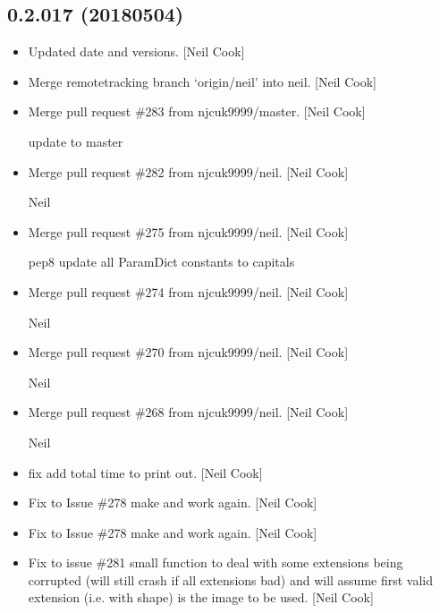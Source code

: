 \documentclass[a4paper,10pt,english]{report}
\begin{document}
\subsection{0.2.017 (2018\sphinxhyphen{}05\sphinxhyphen{}04)}
\label{\detokenize{misc/changelog:id462}}\begin{itemize}
\item {} 
Updated date and versions. {[}Neil Cook{]}

\item {} 
Merge remote\sphinxhyphen{}tracking branch ‘origin/neil’ into neil. {[}Neil Cook{]}

\item {} 
Merge pull request \#283 from njcuk9999/master. {[}Neil Cook{]}

update to master

\item {} 
Merge pull request \#282 from njcuk9999/neil. {[}Neil Cook{]}

Neil

\item {} 
Merge pull request \#275 from njcuk9999/neil. {[}Neil Cook{]}

pep8 update all ParamDict constants to capitals

\item {} 
Merge pull request \#274 from njcuk9999/neil. {[}Neil Cook{]}

Neil

\item {} 
Merge pull request \#270 from njcuk9999/neil. {[}Neil Cook{]}

Neil

\item {} 
Merge pull request \#268 from njcuk9999/neil. {[}Neil Cook{]}

Neil

\item {} 
 fix \sphinxhyphen{} add total time to  print out. {[}Neil Cook{]}

\item {} 
Fix to Issue \#278 \sphinxhyphen{} make  and
 work again. {[}Neil Cook{]}

\item {} 
Fix to Issue \#278 \sphinxhyphen{} make  and
 work again. {[}Neil Cook{]}

\item {} 
Fix to issue \#281 \sphinxhyphen{} small function to deal with some extensions being
corrupted (will still crash if all extensions bad) and will assume
first valid extension (i.e. with shape) is the image to be used. {[}Neil
Cook{]}


\end{itemize}
\end{document}
